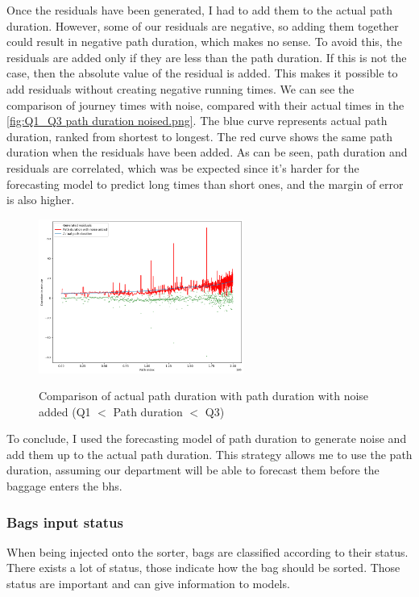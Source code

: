 \documentclass[12pt]{article}
\begin{document}
Once the residuals have been generated, I had to add them to the actual path duration. However, some of our residuals are negative, so adding them together could result in negative path duration, which makes no sense. To avoid this, the residuals are added only if they are less than the path duration. If this is not the case, then the absolute value of the residual is added. This makes it possible to add residuals without creating negative running times. We can see the comparison of journey times with noise, compared with their actual times in the \autoref{fig:Q1_Q3 path duration noised.png}. The blue curve represents actual path duration, ranked from shortest to longest. The red curve shows the same path duration when the residuals have been added. As can be seen, path duration and residuals are correlated, which was be expected since it's harder for the forecasting model to predict long times than short ones, and the margin of error is also higher.

\FloatBarrier
\begin{figure}[h]
    \centering
    \includegraphics[width=0.6\textwidth]{Q1_Q3 path duration noised.png}\\
    \caption{Comparison of actual path duration with path duration with noise added (Q1 $<$ Path duration $<$ Q3)}
    \label{fig:Q1_Q3 path duration noised.png}
\end{figure}
\FloatBarrier

To conclude, I used the forecasting model of path duration to generate noise and add them up to the actual path duration. This strategy allows me to use the path duration, assuming our department will be able to forecast them before the baggage enters the \acrshort{bhs}.


\newpage
\subsubsection{Bags input status}
When being injected onto the sorter, bags are classified according to their status. There exists a lot of status, those indicate how the bag should be sorted. Those status are important and can give information to models.
\end{document}
